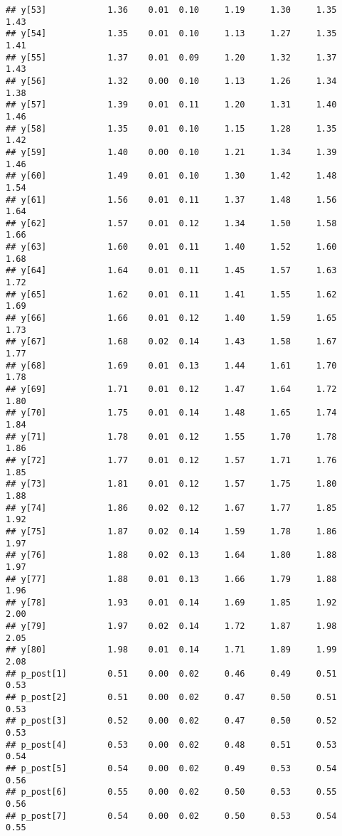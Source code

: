\documentclass{article}\usepackage[]{graphicx}\usepackage[]{color}
\makeatletter
\newenvironment{kframe}{%
 \def\at@end@of@kframe{}%
 \ifinner\ifhmode%
  \def\at@end@of@kframe{\end{minipage}}%
  \begin{minipage}{\columnwidth}%
 \fi\fi%
 \def\FrameCommand##1{\hskip\@totalleftmargin \hskip-\fboxsep
 \colorbox{shadecolor}{##1}\hskip-\fboxsep
     \hskip-\linewidth \hskip-\@totalleftmargin \hskip\columnwidth}%
 \MakeFramed {\advance\hsize-\width
   \@totalleftmargin\z@ \linewidth\hsize
   \@setminipage}}%
 {\par\unskip\endMakeFramed%
 \at@end@of@kframe}
\newenvironment{knitrout}{}{} %
\makeatother
\begin{document}
\begin{knitrout}
\begin{kframe}
\begin{verbatim}
## y[53]            1.36    0.01  0.10     1.19     1.30     1.35     1.43
## y[54]            1.35    0.01  0.10     1.13     1.27     1.35     1.41
## y[55]            1.37    0.01  0.09     1.20     1.32     1.37     1.43
## y[56]            1.32    0.00  0.10     1.13     1.26     1.34     1.38
## y[57]            1.39    0.01  0.11     1.20     1.31     1.40     1.46
## y[58]            1.35    0.01  0.10     1.15     1.28     1.35     1.42
## y[59]            1.40    0.00  0.10     1.21     1.34     1.39     1.46
## y[60]            1.49    0.01  0.10     1.30     1.42     1.48     1.54
## y[61]            1.56    0.01  0.11     1.37     1.48     1.56     1.64
## y[62]            1.57    0.01  0.12     1.34     1.50     1.58     1.66
## y[63]            1.60    0.01  0.11     1.40     1.52     1.60     1.68
## y[64]            1.64    0.01  0.11     1.45     1.57     1.63     1.72
## y[65]            1.62    0.01  0.11     1.41     1.55     1.62     1.69
## y[66]            1.66    0.01  0.12     1.40     1.59     1.65     1.73
## y[67]            1.68    0.02  0.14     1.43     1.58     1.67     1.77
## y[68]            1.69    0.01  0.13     1.44     1.61     1.70     1.78
## y[69]            1.71    0.01  0.12     1.47     1.64     1.72     1.80
## y[70]            1.75    0.01  0.14     1.48     1.65     1.74     1.84
## y[71]            1.78    0.01  0.12     1.55     1.70     1.78     1.86
## y[72]            1.77    0.01  0.12     1.57     1.71     1.76     1.85
## y[73]            1.81    0.01  0.12     1.57     1.75     1.80     1.88
## y[74]            1.86    0.02  0.12     1.67     1.77     1.85     1.92
## y[75]            1.87    0.02  0.14     1.59     1.78     1.86     1.97
## y[76]            1.88    0.02  0.13     1.64     1.80     1.88     1.97
## y[77]            1.88    0.01  0.13     1.66     1.79     1.88     1.96
## y[78]            1.93    0.01  0.14     1.69     1.85     1.92     2.00
## y[79]            1.97    0.02  0.14     1.72     1.87     1.98     2.05
## y[80]            1.98    0.01  0.14     1.71     1.89     1.99     2.08
## p_post[1]        0.51    0.00  0.02     0.46     0.49     0.51     0.53
## p_post[2]        0.51    0.00  0.02     0.47     0.50     0.51     0.53
## p_post[3]        0.52    0.00  0.02     0.47     0.50     0.52     0.53
## p_post[4]        0.53    0.00  0.02     0.48     0.51     0.53     0.54
## p_post[5]        0.54    0.00  0.02     0.49     0.53     0.54     0.56
## p_post[6]        0.55    0.00  0.02     0.50     0.53     0.55     0.56
## p_post[7]        0.54    0.00  0.02     0.50     0.53     0.54     0.55

\end{verbatim}
\end{kframe}
\end{knitrout}
\end{document}
